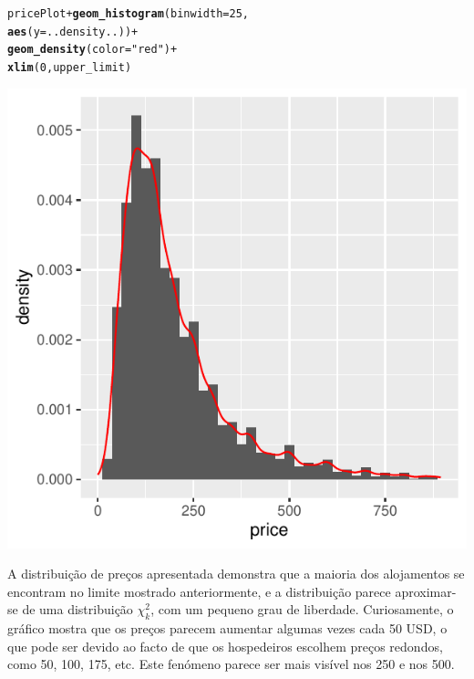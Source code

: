 \documentclass[a4paper, justified]{tufte-handout}\usepackage[]{graphicx}\usepackage[]{xcolor}
\makeatletter
\def\maxwidth{ %
  \ifdim\Gin@nat@width>\linewidth
    \linewidth
  \else
    \Gin@nat@width
  \fi
}
\newcommand{\hlnum}[1]{\textcolor[rgb]{0.686,0.059,0.569}{#1}}%
\newcommand{\hlstr}[1]{\textcolor[rgb]{0.192,0.494,0.8}{#1}}%
\newcommand{\hlopt}[1]{\textcolor[rgb]{0,0,0}{#1}}%
\newcommand{\hlstd}[1]{\textcolor[rgb]{0.345,0.345,0.345}{#1}}%
\newcommand{\hlkwc}[1]{\textcolor[rgb]{0.333,0.667,0.333}{#1}}%
\newcommand{\hlkwd}[1]{\textcolor[rgb]{0.737,0.353,0.396}{\textbf{#1}}}%
\newenvironment{kframe}{%
 \def\at@end@of@kframe{}%
 \ifinner\ifhmode%
  \def\at@end@of@kframe{\end{minipage}}%
  \begin{minipage}{\columnwidth}%
 \fi\fi%
 \def\FrameCommand##1{\hskip\@totalleftmargin \hskip-\fboxsep
 \colorbox{shadecolor}{##1}\hskip-\fboxsep
     \hskip-\linewidth \hskip-\@totalleftmargin \hskip\columnwidth}%
 \MakeFramed {\advance\hsize-\width
   \@totalleftmargin\z@ \linewidth\hsize
   \@setminipage}}%
 {\par\unskip\endMakeFramed%
 \at@end@of@kframe}
\newenvironment{knitrout}{}{} %
\makeatother
\begin{document}
\begin{knitrout}
\color{fgcolor}\begin{kframe}
\begin{alltt}
\hlstd{pricePlot} \hlopt{+} \hlkwd{geom_histogram}\hlstd{(}\hlkwc{binwidth} \hlstd{=} \hlnum{25}\hlstd{,}
    \hlkwd{aes}\hlstd{(}\hlkwc{y} \hlstd{= ..density..))} \hlopt{+}
    \hlkwd{geom_density}\hlstd{(}\hlkwc{color} \hlstd{=} \hlstr{"red"}\hlstd{)} \hlopt{+}
    \hlkwd{xlim}\hlstd{(}\hlnum{0}\hlstd{, upper_limit)}
\end{alltt}
\end{kframe}\begin{marginfigure}
\includegraphics[width=\maxwidth]{figure/chunk-priceHist-1} \end{marginfigure}

\end{knitrout}
A distribuição de preços apresentada demonstra que a maioria dos alojamentos se encontram no limite mostrado anteriormente, e a distribuição parece aproximar-se de uma distribuição $\chi_{k}^{2}$, com um pequeno grau de liberdade. Curiosamente, o gráfico mostra que os preços parecem aumentar algumas vezes cada 50 USD, o que pode ser devido ao facto de que os hospedeiros escolhem preços redondos, como 50, 100, 175, etc. Este fenómeno parece ser mais visível nos 250 e nos 500.\\
\end{document}
